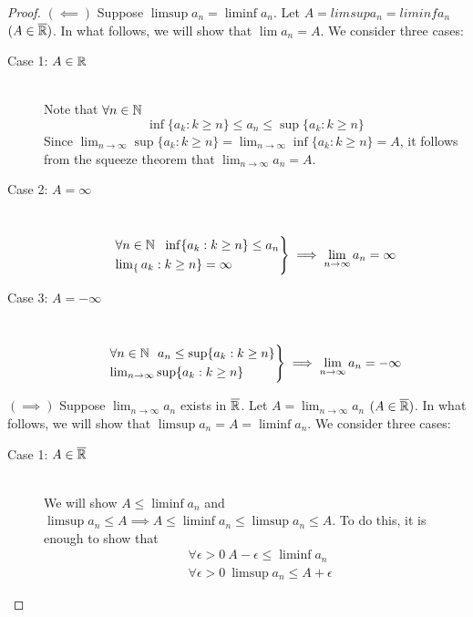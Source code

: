 \begin{proof}
    $(\impliedby)$ Suppose $\limsup a_n = \liminf a_n$. Let $A=limsup a_n = liminf a_n$ $(A\in \overline{\mathbb{R}})$. In what follows, we will show that $\lim a_n = A$. We consider three cases:
    \begin{description}
        \item[Case 1: $A\in \mathbb{R}$] \leavevmode \\
        Note that $\forall n \in \mathbb{N}$
        $$\inf \{a_k : k \geq n\} \leq a_n \leq \sup \{a_k : k \geq n\}$$
        Since $\lim_{n\to \infty} \sup \{a_k : k \geq n\} = \lim_{n \to \infty} \inf\{a_k : k \geq n\} = A$, it follows from the squeeze theorem that $\lim_{n\to \infty}a_n = A$.
        \item[Case 2: $A = \infty$] \leavevmode \\
        $$
        \begin{rcases*}
            \forall n \in \N ~~\inf \{a_k : k \geq n\} \leq a_n \\
            \lim_\{a_k : k \geq n\} = \infty
        \end{rcases*}
        \implies \lim_{n\to \infty} a_n = \infty
        $$
        \item[Case 3: $A=-\infty$] \leavevmode \\
        $$
        \begin{rcases*}
            \forall n \in \N ~~a_n \leq \sup\{a_k : k \geq n\} \\
            \lim_{n \to \infty} \sup \{a_k : k \geq n\}
        \end{rcases*}
        \implies \lim_{n \to \infty}a_n = - \infty
        $$
    \end{description}
    $(\implies)$ Suppose $\lim_{n\to \infty} a_n$ exists in $\overline{\mathbb{R}}$. Let $A = \lim_{n \to \infty} a_n$ $(A \in \overline{\mathbb{R}})$. In what follows, we will show that $\limsup a_n = A = \liminf a_n$. We consider three cases:
    \begin{description}
        \item[Case 1: $A\in\overline{\mathbb{R}}$] \leavevmode \\
        We will show $A\leq \liminf a_n$ and $\limsup a_n \leq A \implies A \leq \liminf a_n \leq \limsup a_n \leq A.$ To do this, it is enough to show that
        \begin{align*}
            &\forall \epsilon > 0 ~A-\epsilon \leq \liminf a_n \\
            &\forall \epsilon > 0 ~\limsup a_n \leq A + \epsilon
        \end{align*}

\end{description}
\end{proof}
